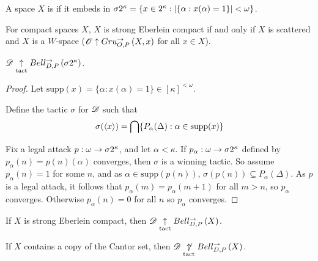 \documentclass[11pt]{article}
\begin{document}
  \begin{definition}
    A space $X$ is  if it embeds in
    $\sigma2^{\kappa}=\{x\in2^\kappa:|\{\alpha:x(\alpha)=1\}|<\omega\}$.
  \end{definition}

  \begin{theorem}[Gruenhage]
    For compact spaces $X$,
    $X$ is strong Eberlein compact if and only if
    $X$ is scattered and $X$ is a $W$-space
    ($\mathscr{O}\uparrow Gru_{O,P}^{\to}\left({X},{x}\right)$ for all $x\in X$).
  \end{theorem}

  \begin{theorem}
    $\mathscr{D}\underset{\text{tact}}{\uparrow}Bell_{D,P}^{\to}\left({\sigma2^{\kappa}}\right)$.
  \end{theorem}

  \begin{proof}
    Let $\text{supp}(x)=\{\alpha:x(\alpha)=1\}\in[\kappa]^{<\omega}$.

    Define the tactic $\sigma$ for $\mathscr{D}$ such that
      \[
        \sigma(\langle x\rangle)
          =
        \bigcap\{
          P_\alpha(\Delta) : \alpha\in\text{supp}(x)
        \}
      \]

    Fix a legal attack $p:\omega\to\sigma2^{\kappa}$, and let
    $\alpha<\kappa$. If $p_\alpha:\omega\to\sigma2^{\kappa}$ defined by
    $p_\alpha(n)=p(n)(\alpha)$ converges, then $\sigma$ is a winning
    tactic. So assume
    $p_\alpha(n)=1$ for some $n$, and as $\alpha\in\text{supp}(p(n))$,
    $\sigma(p(n))\subseteq P_\alpha(\Delta)$. As $p$ is a legal attack,
    it follows that $p_\alpha(m)=p_\alpha(m+1)$ for all $m>n$, so
    $p_\alpha$ converges. Otherwise $p_\alpha(n)=0$ for all $n$ so
    $p_\alpha$ converges.
  \end{proof}

  \begin{corollary}
    If $X$ is strong Eberlein compact, then $\mathscr{D}\underset{\text{tact}}{\uparrow}Bell_{D,P}^{\to}\left({X}\right)$.
  \end{corollary}

  \begin{theorem}\label{cantorCopy}
    If $X$ contains a copy of the Cantor set, then
    $\mathscr{D}\underset{\text{tact}}{\not\uparrow}Bell_{D,P}^{\rightharpoonup}\left({X}\right)$.
  \end{theorem}
\end{document}
